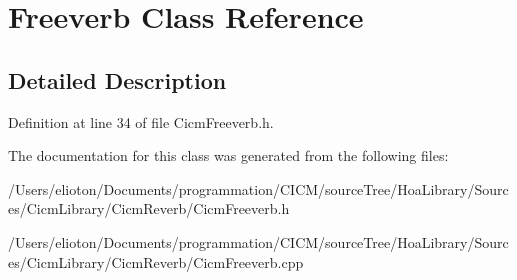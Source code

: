 \hypertarget{class_freeverb}{\section{Freeverb Class Reference}
\label{class_freeverb}
}


\subsection{Detailed Description}


Definition at line 34 of file Cicm\-Freeverb.\-h.



The documentation for this class was generated from the following files\-:\begin{DoxyCompactItemize}
\item 
/\-Users/elioton/\-Documents/programmation/\-C\-I\-C\-M/source\-Tree/\-Hoa\-Library/\-Sources/\-Cicm\-Library/\-Cicm\-Reverb/Cicm\-Freeverb.\-h\item 
/\-Users/elioton/\-Documents/programmation/\-C\-I\-C\-M/source\-Tree/\-Hoa\-Library/\-Sources/\-Cicm\-Library/\-Cicm\-Reverb/Cicm\-Freeverb.\-cpp\end{DoxyCompactItemize}
